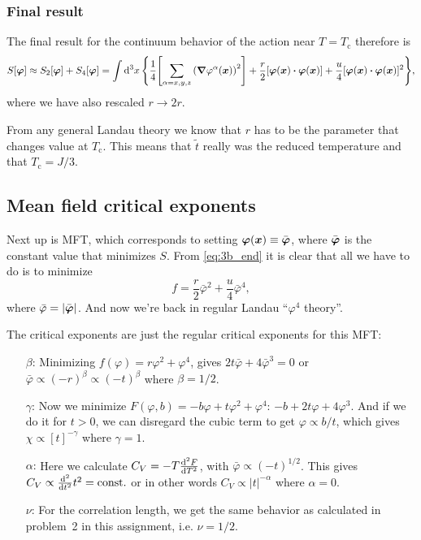\documentclass[11pt,letter, swedish, english
]{article}
\newcommand{\Tc}{\ensuremath{T_{\text{c}}}}
\begin{document}
\subsubsection{Final result}
The final result for the continuum behavior of the action near
$T=\Tc$ therefore is
\begin{equation}\label{eq:3b_end}
S[\vb*\varphi]\approx S_2[\vb*\varphi]+S_4[\vb*\varphi]=
\int\rd^3x\,\qty{
\frac{1}{4}\qty[\sum_{\alpha=x,y,z}\qty(\grad\varphi^\alpha(\vb*x))^2]
+\frac{r}{2}[\vb*\varphi(\vb*x)\vdot\vb*\varphi(\vb*x)]
+\frac{u}{4}[\vb*\varphi(\vb*x)\vdot\vb*\varphi(\vb*x)]^2},
\end{equation}
where we have also rescaled $r\to2r$.

From any general Landau theory we know that $r$ has to be the
parameter that changes value at $\Tc$. This means that $\tilde{t}$
really was the reduced temperature and that $\Tc=J/3$.



\subsection{Mean field critical exponents}
Next up is MFT, which corresponds to setting
$\vb*\varphi(\vb*x)\equiv\bar{\vb*\varphi}$, where
$\bar{\vb*\varphi}$ is the constant value that minimizes $S$. From
\eqref{eq:3b_end} it is clear that all we have to do is to minimize
\begin{equation}
f=\frac{r}{2}\bar\varphi^2+\frac{u}{4}\bar\varphi^4,
\end{equation}
where $\bar\varphi=|\bar{\vb*\varphi}|$. And now we're back in regular
Landau ``$\varphi^4$ theory''. 

The critical exponents are just the regular critical exponents for
this MFT:
\begin{itemize}
\item[$\beta$: ] Minimizing $f(\varphi)=r\varphi^2+\varphi^4$,
gives $2t\bar\varphi+4\bar\varphi^3=0$ or 
$\bar\varphi\propto(-r)^{\beta}\propto(-t)^{\beta}$ where $\beta=1/2$.
\item[$\gamma$: ] Now we minimize $F(\varphi,
b)=-b\varphi+t\varphi^2+\varphi^4$: $-b+2t\varphi+4\varphi^3$. And if
we do it for $t>0$, we can disregard the cubic term to get
$\varphi\propto b/t$, which gives $\chi\propto[t]^{-\gamma}$ where
$\gamma=1$.
\item[$\alpha$: ] Here we calculate $C_V=-T\dv[2]{F}{T}$, with
$\bar\varphi\propto(-t)^{1/2}$. This gives
$C_V\propto\dv[2]{t}t^2=\text{const.}$ or in other words
$C_V\propto|t|^{-\alpha}$ where $\alpha=0$.
\item[$\nu$: ] For the correlation length, we get the same behavior as
calculated in problem~2 in this assignment, i.e. $\nu=1/2$.
\end{itemize}
\end{document}
